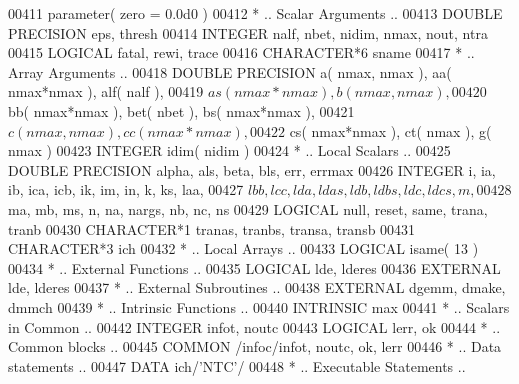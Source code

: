 \begin{DoxyCode}
00411       parameter( zero = 0.0d0 )
00412 \textcolor{comment}{*     .. Scalar Arguments ..}
00413       \textcolor{keywordtype}{DOUBLE PRECISION}   eps, thresh
00414       \textcolor{keywordtype}{INTEGER}            nalf, nbet, nidim, nmax, nout, ntra
00415       \textcolor{keywordtype}{LOGICAL}            fatal, rewi, trace
00416       \textcolor{keywordtype}{CHARACTER*6}        sname
00417 \textcolor{comment}{*     .. Array Arguments ..}
00418       \textcolor{keywordtype}{DOUBLE PRECISION}   a( nmax, nmax ), aa( nmax*nmax ), alf( nalf ),
00419      $                   as( nmax*nmax ), b( nmax, nmax ),
00420      $                   bb( nmax*nmax ), bet( nbet ), bs( nmax*nmax ),
00421      $                   c( nmax, nmax ), cc( nmax*nmax ),
00422      $                   cs( nmax*nmax ), ct( nmax ), g( nmax )
00423       \textcolor{keywordtype}{INTEGER}            idim( nidim )
00424 \textcolor{comment}{*     .. Local Scalars ..}
00425       \textcolor{keywordtype}{DOUBLE PRECISION}   alpha, als, beta, bls, err, errmax
00426       \textcolor{keywordtype}{INTEGER}            i, ia, ib, ica, icb, ik, im, in, k, ks, laa,
00427      $                   lbb, lcc, lda, ldas, ldb, ldbs, ldc, ldcs, m,
00428      $                   ma, mb, ms, n, na, nargs, nb, nc, ns
00429       \textcolor{keywordtype}{LOGICAL}            null, reset, same, trana, tranb
00430       \textcolor{keywordtype}{CHARACTER*1}        tranas, tranbs, transa, transb
00431       \textcolor{keywordtype}{CHARACTER*3}        ich
00432 \textcolor{comment}{*     .. Local Arrays ..}
00433       \textcolor{keywordtype}{LOGICAL}            isame( 13 )
00434 \textcolor{comment}{*     .. External Functions ..}
00435       \textcolor{keywordtype}{LOGICAL}            lde, lderes
00436       \textcolor{keywordtype}{EXTERNAL}           lde, lderes
00437 \textcolor{comment}{*     .. External Subroutines ..}
00438       \textcolor{keywordtype}{EXTERNAL}           dgemm, dmake, dmmch
00439 \textcolor{comment}{*     .. Intrinsic Functions ..}
00440       \textcolor{keywordtype}{INTRINSIC}          max
00441 \textcolor{comment}{*     .. Scalars in Common ..}
00442       \textcolor{keywordtype}{INTEGER}            infot, noutc
00443       \textcolor{keywordtype}{LOGICAL}            lerr, ok
00444 \textcolor{comment}{*     .. Common blocks ..}
00445       \textcolor{keyword}{COMMON}             /infoc/infot, noutc, ok, lerr
00446 \textcolor{comment}{*     .. Data statements ..}
00447       \textcolor{keyword}{DATA}               ich/\textcolor{stringliteral}{'NTC'}/
00448 \textcolor{comment}{*     .. Executable Statements ..}

\end{DoxyCode}
